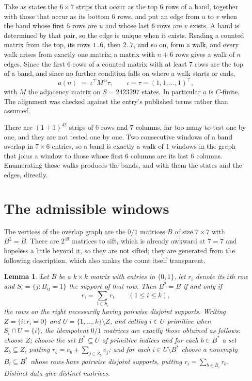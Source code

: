 \documentclass[11pt,a4paper]{article}
\theoremstyle{plain}
\newtheorem{lemma}[theorem]{Lemma}
\theoremstyle{definition}
\begin{document}
Take as states the $6\times7$ strips that occur as the top $6$ rows of a band,
together with those that occur as its bottom $6$ rows, and put an edge from $u$ to $v$
when the band whose first $6$ rows are $u$ and whose last $6$ rows are $v$ exists.
A band is determined by that pair, so the edge is unique when it exists. Reading a counted
matrix from the top, its rows $1..6$, then $2..7$, and so on, form a walk, and every
walk arises from exactly one matrix; a matrix with $n+6$ rows gives a walk of $n$ edges.
Since the first $6$ rows of a counted matrix with at least $7$ rows are the top of a
band, and since no further condition falls on where a walk starts or ends,
\[
a(n)\;=\;\iota^{\!\top}M^{\,n}\tau ,\qquad \iota=\tau=(1,1,\dots,1)^{\!\top},
\]
with $M$ the adjacency matrix on $S=2423297$ states. In particular $a$ is $C$-finite. The
alignment was checked against the entry's published terms rather than assumed.

There are $(1 + 1)^{42}$ strips of $6$ rows and $7$ columns, far too
many to test one by one, and they are not tested one by one. Two consecutive windows of a band
overlap in $7\times6$ entries, so a band is exactly a walk of $1$ windows in
the graph that joins a window to those whose first $6$ columns are its last $6$
columns. Enumerating those walks produces the bands, and with them the states and the edges,
directly.

\section{The admissible windows}

The vertices of the overlap graph are the $0/1$ matrices $B$ of size $7\times7$ with
$B^2=B$. There are $2^{49}$ matrices to sift, which is already awkward at $7=7$ and
hopeless a little beyond it, so they are not sifted; they are generated from the following
description, which also makes the count itself transparent.

\begin{lemma}\label{lem:idem}
Let $B$ be a $k\times k$ matrix with entries in $\{0,1\}$, let $r_i$ denote its $i$th row and
$S_i=\{j:B_{ij}=1\}$ the support of that row. Then $B^2=B$ if and only if
\[
r_i=\sum_{t\in S_i}r_t \qquad (1\le i\le k),
\]
the rows on the right necessarily having pairwise disjoint supports. Writing
$Z=\{i:r_i=0\}$ and $U=\{1,\dots,k\}\setminus Z$, and calling $i\in U$ \emph{primitive}
when $S_i\cap U=\{i\}$, the idempotent $0/1$ matrices are exactly those obtained as follows:
choose $Z$; choose the set $B^{\ast}\subseteq U$ of primitive indices and for each
$b\in B^{\ast}$ a set $Z_b\subseteq Z$, putting $r_b=e_b+\sum_{j\in Z_b}e_j$; and for each
$i\in U\setminus B^{\ast}$ choose a nonempty $B_i\subseteq B^{\ast}$ whose rows have
pairwise disjoint supports, putting $r_i=\sum_{b\in B_i}r_b$. Distinct data give distinct
matrices.
\end{lemma}
\end{document}
